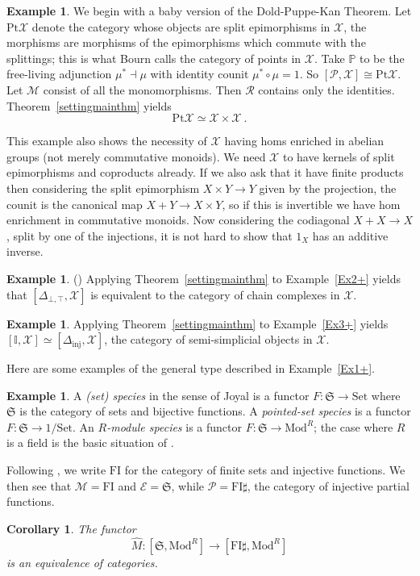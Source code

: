 \documentclass[a4paper,12pt,reqno]{amsart}
\newtheorem{corollary}[theorem]{Corollary}
\theoremstyle{definition}
\newtheorem{example}[theorem]{Example}
\theoremstyle{fact}
\theoremstyle{genquest}
\theoremstyle{step}
\newcommand{\lra}{\longrightarrow}
\newcommand{\ra}{\rightarrow}
\def\CE{{\mathscr E}}
\def\CM{{\mathscr M}}
\def\CP{{\mathscr P}}
\def\CR{{\mathscr R}}
\def\CX{{\mathscr X}}
\begin{document}
\begin{example}\label{babyDPK} 
We begin with a baby version of the Dold-Puppe-Kan Theorem.
Let $\mathrm{Pt}\CX$ denote the category whose objects are split epimorphisms in $\CX$, the morphisms are morphisms of the epimorphisms
which commute with the splittings; this is what Bourn \cite{Bourn91} calls the category of points in $\CX$.  
Take $\mathbb{P}$ to be the free-living adjunction $\mu^*\dashv \mu$ with identity counit $\mu^*\circ \mu = 1$.
So $[\CP,\CX] \cong \mathrm{Pt}\CX$.  
Let $\CM$ consist of all the monomorphisms. 
Then $\CR$ contains only the identities. 
Theorem~\ref{settingmainthm} yields $$\mathrm{Pt}\CX \simeq \CX \times \CX \ .$$

This example also shows the necessity of $\CX$ having homs enriched in abelian groups (not merely commutative monoids). 
We need $\CX$ to have kernels of split epimorphisms and coproducts already. 
If we also ask that it have finite products then considering the split epimorphism $X\times Y\ra Y$ given by the projection, the counit 
is the canonical map $X+Y \ra X\times Y$, 
so if this is invertible we have hom enrichment in commutative monoids. 
Now considering the codiagonal $X+ X\ra X$, split by one of the 
injections, it is not hard to show that $1_X$ has an additive inverse. 
\end{example}

\begin{example}\label{DPK} (\cite{Dold, DoldPuppe, Kan}) Applying Theorem~\ref{settingmainthm} to 
Example~\ref{Ex2+} yields that $[\Delta_{\bot,\top},\CX]$ is equivalent to 
the category of chain complexes in $\CX$.
\end{example}

\begin{example} 
Applying Theorem~\ref{settingmainthm} to Example~\ref{Ex3+} yields 
$[\mathbb{I},\CX] \simeq [\Delta_{\mathrm{inj}},\CX]$, the category of semi-simplicial objects in $\CX$.
\end{example}
\bigskip

Here are some examples of the general type described in Example~\ref{Ex1+}.
\bigskip

\begin{example} A {\em (set) species} in the sense of Joyal \cite{Species} is a functor 
$F : \mathfrak{S} \lra \mathrm{Set}$
where $\mathfrak{S}$ is the category of sets and bijective functions. 
A {\em pointed-set species} is a functor 
$F : \mathfrak{S} \lra 1/\mathrm{Set}$.
An {\em $R$-module species} is a functor 
$F : \mathfrak{S} \lra \mathrm{Mod}^R$; the case where $R$ is
a field is the basic situation of \cite{AnalFunct}.

Following \cite{CEF2012}, we write $\mathrm{FI}$ for the category of finite sets
and injective functions. We then see that 
$\CM = \mathrm{FI}$ and $\CE = \mathfrak{S}$,
while $\CP = \mathrm{FI}\sharp$, the category of injective partial functions.  

\begin{corollary} \cite{CEF2012} The functor
$$\widehat{M} : [\mathfrak{S}, \mathrm{Mod}^R] \lra [\mathrm{FI}\sharp, \mathrm{Mod}^R]$$
is an equivalence of categories.
\end{corollary}
\end{example}
\end{document}
